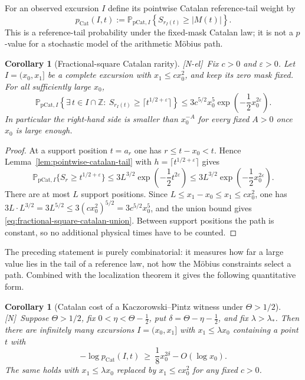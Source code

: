 \documentclass[11pt]{amsart}
\numberwithin{equation}{section}
\theoremstyle{plain}
\newtheorem{corollary}[theorem]{Corollary}
\theoremstyle{definition}
\theoremstyle{remark}
\newcommand{\eps}{\varepsilon}
\newcommand{\tagN}{\textup{[N]}}
\newcommand{\tagNE}{\textup{[N-el]}}
\begin{document}
For an observed excursion $I$ define its pointwise Catalan reference-tail weight
by
\begin{equation}
\label{eq:pointwise-catalan-pvalue}
 p_{\mathrm{Cat}}(I,t):=
 \mathbb P_{\mathrm{pCat},I}
 \left\{S_{r_I(t)}\ge |M(t)|\right\}.
\end{equation}
This is a reference-tail probability under the fixed-mask Catalan law; it is
not a $p$-value for a stochastic model of the arithmetic M\"obius path.

\begin{corollary}[Fractional-square Catalan rarity]
\label{cor:fractional-square-catalan-rarity}
\tagNE\ Fix $c>0$ and $\eps>0$.  Let $I=(x_0,x_1]$ be a complete excursion with
$x_1\le cx_0^2$, and keep its zero mask fixed.  For all sufficiently large
$x_0$,
\begin{equation}
\label{eq:fractional-square-catalan-union}
 \mathbb P_{\mathrm{pCat},I}
 \left\{\exists\,t\in I\cap\mathbb Z:\ S_{r_I(t)}\ge \lceil t^{1/2+\eps}\rceil\right\}
 \le 3c^{5/2}x_0^5
 \exp\!\left(-\frac12x_0^{2\eps}\right).
\end{equation}
In particular the right-hand side is smaller than $x_0^{-A}$ for every
fixed $A>0$ once $x_0$ is large enough.
\end{corollary}

\begin{proof}
At a support position $t=a_r$ one has $r\le t-x_0<t$.  Hence
Lemma~\ref{lem:pointwise-catalan-tail} with $h=\lceil t^{1/2+\eps}\rceil$ gives
\[
 \mathbb P_{\mathrm{pCat},I}\{S_r\ge t^{1/2+\eps}\}
 \le3L^{3/2}\exp\!\left(-\frac12t^{2\eps}\right)
 \le3L^{3/2}\exp\!\left(-\frac12x_0^{2\eps}\right).
\]
There are at most $L$ support positions.  Since
$L\le x_1-x_0\le x_1\le cx_0^2$, one has
$3L\cdot L^{3/2}=3L^{5/2}\le3(cx_0^2)^{5/2}=3c^{5/2}x_0^5$, and the union
bound gives
\eqref{eq:fractional-square-catalan-union}.  Between support positions the
path is constant, so no additional physical times have to be counted.
\end{proof}

The preceding statement is purely combinatorial: it measures how far a large
value lies in the tail of a reference law, not how the M\"obius constraints
select a path. Combined with the localization theorem it gives the following
quantitative form.

\begin{corollary}[Catalan cost of a Kaczorowski--Pintz witness under $\Theta>1/2$]
\label{cor:catalan-surprise}
\tagN\ Suppose $\Theta>1/2$, fix $0<\eta<\Theta-\frac12$, put
$\delta=\Theta-\eta-\frac12$, and fix $\lambda>\lambda_*$. Then there are
infinitely many excursions $I=(x_0,x_1]$ with $x_1\le\lambda x_0$ containing
a point $t$ with
\begin{equation}
\label{eq:KP-catalan-surprise}
-\log p_{\mathrm{Cat}}(I,t)\ \ge\ \frac18x_0^{2\delta}-O(\log x_0).
\end{equation}
The same holds with $x_1\le\lambda x_0$ replaced by $x_1\le cx_0^2$ for any
fixed $c>0$.
\end{corollary}
\end{document}

